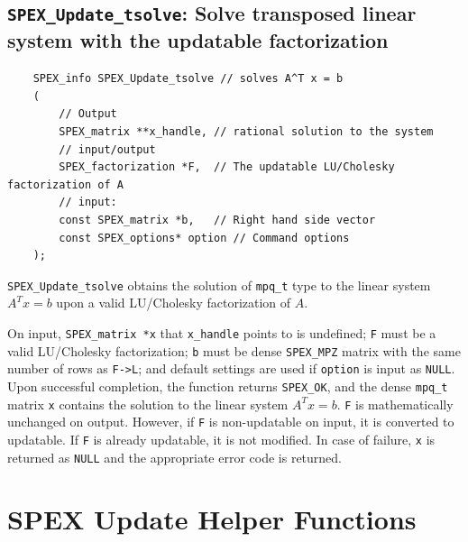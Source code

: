 \documentclass[12pt,oneside]{book}
\theoremstyle{definition}
\begin{document}
{\subsection{\texttt{SPEX\_Update\_tsolve}: Solve transposed linear system with the updatable factorization} \label{ss:SPEX_Update_tsolve}
\begin{mdframed}[userdefinedwidth=\textwidth]
{\footnotesize
\begin{verbatim}
    SPEX_info SPEX_Update_tsolve // solves A^T x = b
    (
        // Output
        SPEX_matrix **x_handle, // rational solution to the system
        // input/output
        SPEX_factorization *F,  // The updatable LU/Cholesky factorization of A
        // input:
        const SPEX_matrix *b,   // Right hand side vector
        const SPEX_options* option // Command options
    );
\end{verbatim}
} \end{mdframed}


\verb|SPEX_Update_tsolve| obtains the solution of \verb|mpq_t| type to the
linear system $A^Tx=b$ upon a valid LU/Cholesky factorization of $A$.

On input, \verb|SPEX_matrix *x| that \verb|x_handle| points to is undefined; \verb|F| must be a valid LU/Cholesky factorization; \verb|b| must be dense \verb|SPEX_MPZ| matrix with the same number of rows as \verb|F->L|; and default settings are used if
\verb|option| is input as \verb|NULL|. Upon successful completion, the function returns \verb|SPEX_OK|, and the dense \verb|mpq_t| matrix \verb|x|
contains the solution   to the linear
system $A^Tx=b$. \verb|F| is mathematically unchanged on output. However, if \verb|F| is non-updatable on input, it is converted to updatable. If \verb|F| is already updatable, it is not modified.
In case of failure, \verb|x| is returned as \verb|NULL| and the appropriate error code is returned.


\section {SPEX Update Helper Functions}

}
\end{document}
